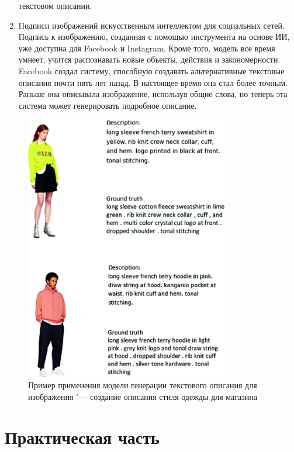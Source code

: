 \documentclass[bachelor, och, coursework]{SCWorks}
\begin{document}
\begin{enumerate}
                текстовом описании.
            \item
                Подписи изображений искусственным интеллектом для социальных
                сетей. Подпись к изображению, созданная с помощью инструмента на
                основе ИИ, уже доступна для Facebook и Instagram. Кроме того,
                модель все время умнеет, учится распознавать новые объекты,
                действия и закономерности. Facebook создал систему, способную
                создавать альтернативные текстовые описания почти пять лет
                назад. В настоящее время она стал более точным. Раньше она
                описывала изображение, используя общие слова, но теперь эта
                система может генерировать подробное описание.
        \end{enumerate}

        \begin{figure}[H]
            \centering
            \includegraphics[width=0.8\textwidth]{pics/example.png}
            \caption{Пример применения модели генерации текстового описания для
                     изображения "--- создание описания стиля одежды для
                     магазина}
        \end{figure}

\section{Практическая часть}
\end{document}
